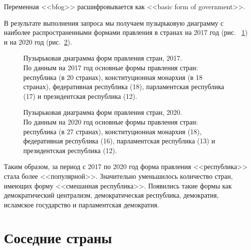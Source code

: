 
Переменная <<bfog>> расшифровывается как <<basic form of government>>.

В результате выполнения запроса мы получаем пузырьковую диаграмму с наиболее распространенными формами правления в странах на 2017 год (рис. ~\ref{fig:bubble_chart_forms_of_government_countries_2017}) и на 2020 год (рис.~\ref{fig:bubble_chart_forms_of_government_countries_2020}).

\begin{figure}
	{
		\setlength{\fboxsep}{0pt}%
		\setlength{\fboxrule}{1pt}%
	}
	\caption{Пузырьковая диаграмма форм правления стран, 2017.
		\\			
		По данным на 2017 год основные формы правления стран: республика (в 20 странах), конституционная монархия (в 18 странах), федеративная республика (18), парламентская республика (17) и президентская республика (12).}%
	\label{fig:bubble_chart_forms_of_government_countries_2017}%
\end{figure}

\begin{figure}
	{
		\setlength{\fboxsep}{0pt}%
		\setlength{\fboxrule}{1pt}%
	}
	\caption{Пузырьковая диаграмма форм правления стран, 2020.
	\\
	По данным на 2020 год  основные формы правления стран: республика (в 27 странах), конституционная монархия (18), федеративная республика (16), парламентская республика (13) и президентская республика (12).
}%
	\label{fig:bubble_chart_forms_of_government_countries_2020}%
\end{figure}

Таким образом, за период с 2017 по 2020 год форма правления <<республика>> стала более <<популярной>>. Значительно уменьшилось количество стран, имеющих форму  <<смешанная республика>>. Появились такие формы как демократический централизм, демократическая республика, демократия, исламское государство и парламентская демократия.

\section{Соседние страны}

